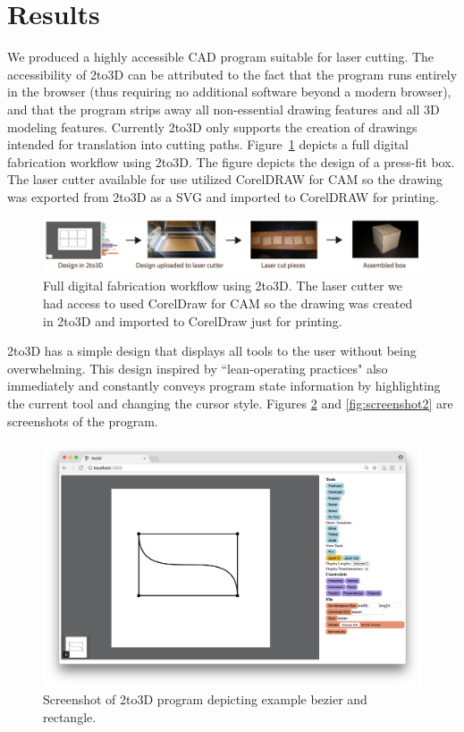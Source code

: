 \section{Results}

We produced a highly accessible CAD program suitable for laser cutting. The accessibility of 2to3D can be attributed to the fact that the program runs entirely in the browser (thus requiring no additional software beyond a modern browser), and that the program strips away all non-essential drawing features and all 3D modeling features. Currently 2to3D only supports the creation of drawings intended for translation into cutting paths. Figure~\ref{fig:usingProgram} depicts a full digital fabrication workflow using 2to3D. The figure depicts the design of a press-fit box. The laser cutter available for use utilized CorelDRAW for CAM so the drawing was exported from 2to3D as a SVG and imported to CorelDRAW for printing.

\begin{figure}[H]
  \includegraphics[width=\linewidth]{usingProgram.jpg}
  \caption{Full digital fabrication workflow using 2to3D. The laser cutter we had access to used CorelDraw for CAM so the drawing was created in 2to3D and imported to CorelDraw just for printing.}
  \label{fig:usingProgram}
\end{figure}

2to3D has a simple design that displays all tools to the user without being overwhelming. This design inspired by ``lean-operating practices" also immediately and constantly conveys program state information by highlighting the current tool and changing the cursor style. Figures \ref{fig:screenshot} and \ref{fig:screenshot2} are screenshots of the program.

\begin{figure}[H]
  \includegraphics[width=\linewidth]{screenshot.png}
  \caption{Screenshot of 2to3D program depicting example bezier and rectangle.}
  \label{fig:screenshot}
\end{figure}

